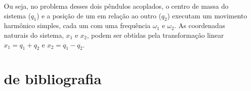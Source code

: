 \documentclass[a4paper, 11pt]{article}
\begin{document}
	Ou seja, no problema desses dois pêndulos acoplados, o centro de massa do sistema ($q_1$) e a posição de um em relação ao outro ($q_2$) executam um movimento harmônico simples, cada um com uma frequência $\omega_1$ e $\omega_2$. As coordenadas naturais do sistema, $x_1$ e $x_2$, podem ser obtidas pela transformação linear $x_1=q_1+q_2$ e $x_2 = q_1-q_2$. 
	
\section{ de bibliografia}
\lipsum


\newpage
\nocite{*}


\end{document}
